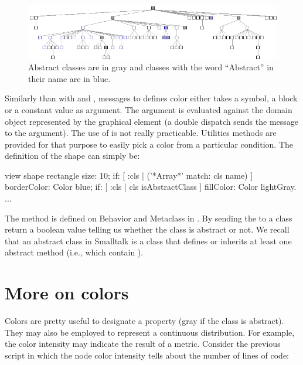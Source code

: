 \documentclass[a4paper,10pt,twoside]{book}
\begin{document}
\begin{figure}[htbp]
\centerline{\includegraphics[width=\linewidth]{arrayClasses}}
\caption{Abstract classes are in gray and classes with the word ``Abstract'' in their name are in blue.}
\label{fig:abstractClasses}
\end{figure}

Similarly than with  and , messages to defines color either takes a symbol, a block or a constant value as argument. The argument is evaluated against the domain object represented by the graphical element (a double dispatch sends the message  to the argument). 
The use of  is not really practicable. Utilities methods are provided for that purpose to easily pick a color from a particular condition. The definition of the shape can simply be:

\begin{code}{}
view shape rectangle
	size: 10;
	if: [ :cls | ('*Array*' match: cls name) ] borderColor: Color blue;
	if: [ :cls | cls isAbstractClass ] fillColor: Color lightGray.
...
\end{code}

The method  is defined on Behavior and Metaclass in \pharo. By sending the  to a class return a boolean value telling us whether the class is abstract or not. We recall that an abstract class in Smalltalk is a class that defines or inherits at least one  abstract method (i.e., which contain ).



\section{More on colors}

Colors are pretty useful to designate a property (\eg gray if the class is abstract). They may also be employed to represent a continuous distribution. For example, the color intensity may indicate the result of a metric. Consider the previous script in which the node color intensity tells about the number of lines of code:
\end{document}

